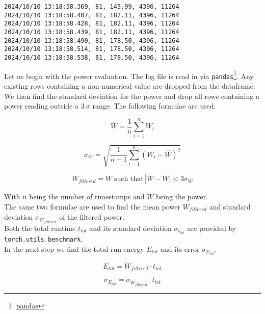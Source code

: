 \begin{verbatim}
2024/10/10 13:18:58.369, 81, 145.99, 4396, 11264
2024/10/10 13:18:58.407, 81, 182.11, 4396, 11264
2024/10/10 13:18:58.428, 81, 182.11, 4396, 11264
2024/10/10 13:18:58.439, 81, 182.11, 4396, 11264
2024/10/10 13:18:58.490, 81, 178.50, 4396, 11264
2024/10/10 13:18:58.514, 81, 178.50, 4396, 11264
2024/10/10 13:18:58.538, 81, 178.50, 4396, 11264
\end{verbatim}

Let us begin with the power evaluation. The log file is read in via \texttt{pandas}\footnote{\href{https://pandas.pydata.org/}{pandas}}. Any existing rows containing a non-numerical value are dropped from the dataframe. We then find the standard deviation for the power and drop all rows containing a power reading outside a $3 \: \sigma $ range. The following formulae are used:

\begin{equation}
\overline{W} = \frac{1}{n} \sum_{i=1}^{n} W_i
\end{equation}

\begin{equation}
\sigma_W = \sqrt{\frac{1}{n - 1} \sum_{i=1}^{n} (W_i - \overline{W})^2}
\end{equation}

\begin{equation}
W_{filtered} = W \; \text{such that} \, |W - \overline{W}| < 3 \sigma_W
\end{equation}
    
With \( n \) being the number of timestamps and \( W \) being the power. \\
The same two formulae are used to find the mean power \( \overline{W}_{filtered} \) and standard deviation \( \sigma_{\overline{W}_{filtered}} \) of the filtered power. \\
Both the total runtime \(t_{tot}\) and its standard deviation \(\sigma_{t_{tot}} \) are provided by \texttt{torch.utils.benchmark}.\\
In the next step we find the total run energy \( E_{tot} \) and its error \( \sigma_{E_{tot}} \).

\begin{equation}
E_{tot} = \overline{W}_{filtered} \cdot t_{tot}
\end{equation}

\begin{equation}
\sigma_{E_{tot}} = \sigma_{\overline{W}_{filtered}} \cdot t_{tot}
\end{equation}

